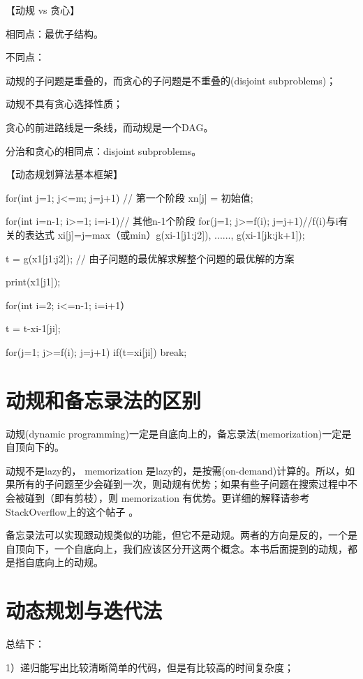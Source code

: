 【动规 vs 贪心】

相同点：最优子结构。

不同点：
\begindot
\item[1]动规的子问题是重叠的，而贪心的子问题是不重叠的(disjoint subproblems)；
\item[2]动规不具有贪心选择性质；
\item[3]贪心的前进路线是一条线，而动规是一个DAG。
\myenddot

分治和贪心的相同点：disjoint subproblems。

【动态规划算法基本框架】

\begin{Code}
	for(int j=1; j<=m; j=j+1) // 第一个阶段
		xn[j] = 初始值;
	
	for(int i=n-1; i>=1; i=i-1)// 其他n-1个阶段
		for(j=1; j>=f(i); j=j+1)//f(i)与i有关的表达式
			xi[j]=j=max（或min）{g(xi-1[j1:j2]), ......, g(xi-1[jk:jk+1])};
	
	t = g(x1[j1:j2]); // 由子问题的最优解求解整个问题的最优解的方案
	
	print(x1[j1]);
	
	for(int i=2; i<=n-1; i=i+1）{  
		t = t-xi-1[ji];
		
		for(j=1; j>=f(i); j=j+1)
			if(t=xi[ji]) break;
	}
\end{Code}

\section{动规和备忘录法的区别} %
\label{sec:dp-vs-memorization}

动规(dynamic programming)一定是自底向上的，备忘录法(memorization)一定是自顶向下的。

动规不是lazy的， memorization 是lazy的，是按需(on-demand)计算的。所以，如果所有的子问题至少会碰到一次，则动规有优势；如果有些子问题在搜索过程中不会被碰到（即有剪枝），则 memorization 有优势。更详细的解释请参考StackOverflow上的这个帖子  。

备忘录法可以实现跟动规类似的功能，但它不是动规。两者的方向是反的，一个是自顶向下，一个自底向上，我们应该区分开这两个概念。本书后面提到的动规，都是指自底向上的动规。

\section{动态规划与迭代法}
总结下：

1）递归能写出比较清晰简单的代码，但是有比较高的时间复杂度；

